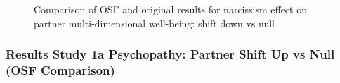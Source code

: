 \documentclass[
  singlecolumn]{article}
\begin{document}
\begin{figure}


\caption{\label{fig-results-narcissism-partner-down-comparison}Comparison
of OSF and original results for narcissism effect on partner
multi-dimensional well-being: shift down vs null}

\end{figure}%

\newpage{}

\subsubsection{Results Study 1a Psychopathy: Partner Shift Up vs Null
(OSF
Comparison)}\label{results-study-1a-psychopathy-partner-shift-up-vs-null-osf-comparison}
\end{document}
